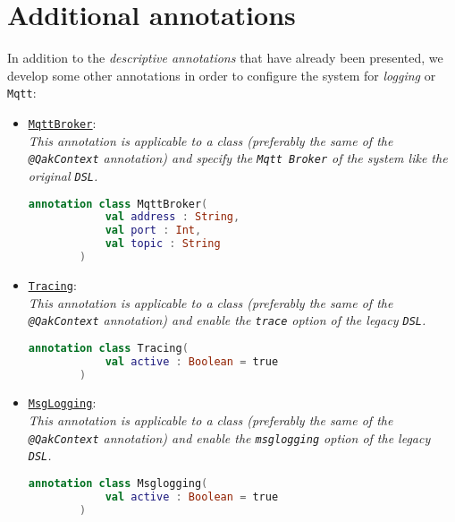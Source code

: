 \section{Additional annotations}

In addition to the \textit{descriptive annotations} that have already been presented, we develop some other annotations in order to configure the system for \textit{logging} or \texttt{Mqtt}:

\begin{itemize}
	\item \href{https://github.com/LM-96/QA-Extensions/blob/main/it.unibo.qakactor/src/main/kotlin/annotations/MqttBroker.kt}{\textcolor{YellowOrange}{\underline{\texttt{MqttBroker}}}}:\\
	\textit{This annotation is applicable to a class (preferably the same of the \texttt{@QakContext} annotation) and specify the \texttt{Mqtt Broker} of the system like the original \texttt{DSL}.}
	\begin{lstlisting}[numbers=none,language=Kotlin]
		annotation class MqttBroker(
			val address : String,
			val port : Int,
			val topic : String
		)
	\end{lstlisting}
	
	\item \href{https://github.com/LM-96/QA-Extensions/blob/main/it.unibo.qakactor/src/main/kotlin/annotations/Tracing.kt}{\textcolor{YellowOrange}{\underline{\texttt{Tracing}}}}:\\
	\textit{This annotation is applicable to a class (preferably the same of the \texttt{@QakContext} annotation) and enable the \texttt{trace} option of the legacy \texttt{DSL}.}
	\begin{lstlisting}[numbers=none,language=Kotlin]
		annotation class Tracing(
			val active : Boolean = true
		)
	\end{lstlisting}

	\item \href{https://github.com/LM-96/QA-Extensions/blob/main/it.unibo.qakactor/src/main/kotlin/annotations/Msglogging.kt}{\textcolor{YellowOrange}{\underline{\texttt{MsgLogging}}}}:\\
	\textit{This annotation is applicable to a class (preferably the same of the \texttt{@QakContext} annotation) and enable the \texttt{msglogging} option of the legacy \texttt{DSL}.}
	\begin{lstlisting}[numbers=none,language=Kotlin]
		annotation class Msglogging(
			val active : Boolean = true
		)
	\end{lstlisting}
	

\end{itemize}